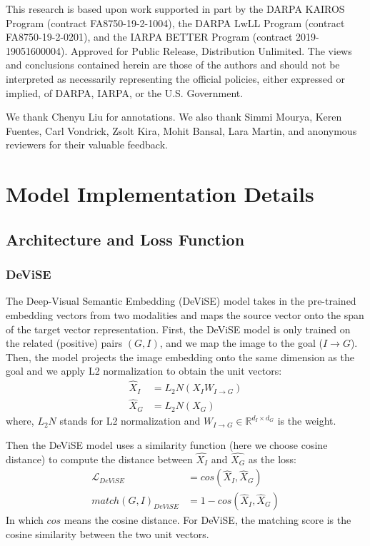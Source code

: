 \documentclass[11pt]{article}
\begin{document}
This research is based upon work supported in part by the DARPA KAIROS Program (contract FA8750-19-2-1004), the DARPA LwLL Program (contract FA8750-19-2-0201), and the IARPA BETTER Program (contract 2019-19051600004). Approved for Public Release, Distribution Unlimited. The views and conclusions contained herein are those of the authors and should not be interpreted as necessarily representing the official policies, either expressed or implied, of DARPA, IARPA, or the U.S. Government.

We thank Chenyu Liu for annotations. We also thank Simmi Mourya, Keren Fuentes, Carl Vondrick, Zsolt Kira, Mohit Bansal, Lara Martin, and anonymous reviewers for their valuable feedback. 




\clearpage

\newpage

\appendix
\section{Model Implementation Details}
\subsection{Architecture and Loss Function}
\subsubsection{DeViSE}
The Deep-Visual Semantic Embedding (DeViSE) model takes in the pre-trained embedding vectors from two modalities and maps the source vector onto the span of the target vector representation. First, the DeViSE model is only trained on the related (positive) pairs $(G, I)$, and we map the image to the goal ($I \rightarrow G$). Then, the model projects the image embedding onto the same dimension as the goal and we apply L2 normalization to obtain the unit vectors:
\begin{equation} \label{eq2}
\begin{split}
    \hat{X}_I &= L_2N(X_I W_{I \rightarrow G}) \\
    \hat{X}_G &= L_2N(X_G)
\end{split}
\end{equation}
where, $L_2N$ stands for L2 normalization and $W_{I \rightarrow G} \in  \mathbb{R}^{d_I \times d_G}$ is the weight. 

Then the DeViSE model uses a similarity function (here we choose cosine distance) to compute the distance between $\hat{X_I}$ and $\hat{X_G}$ as the loss:
\begin{equation}
\begin{split}
    \mathcal{L}_{DeViSE} &= cos(\hat{X}_I, \hat{X}_G) \\
    match(G, I)_{DeViSE} &= 1 - cos(\hat{X}_I, \hat{X}_G)
\end{split}
\end{equation}
In which $cos$ means the cosine distance. For DeViSE, the matching score is the cosine similarity between the two unit vectors.
\end{document}
